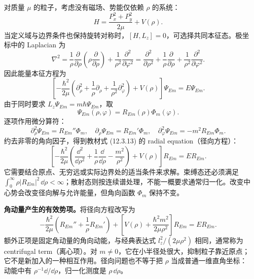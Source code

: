 对质量 $\mu$ 的粒子，考虑没有磁场、势能仅依赖 $\rho$ 的系统：
\begin{equation}
  H=\frac{P_x^2+P_y^2}{2\mu}+V(\rho).
\end{equation}
当定义域与边界条件也保持旋转对称时，$[H,L_z]=0$，可选择共同本征态。极坐标中的 Laplacian 为
\begin{equation}
  \nabla^2=\frac{1}{\rho}\frac{\partial}{\partial\rho}
          \left(\rho\frac{\partial}{\partial\rho}\right)
          +\frac{1}{\rho^2}\frac{\partial^2}{\partial\varphi^2}
  =\frac{\partial^2}{\partial\rho^2}
    +\frac{1}{\rho}\frac{\partial}{\partial\rho}
    +\frac{1}{\rho^2}\frac{\partial^2}{\partial\varphi^2}.
\end{equation}
因此能量本征方程为
\begin{equation}
  \left[-\frac{\hbar^2}{2\mu}
    \left(\partial_\rho^2+\frac{1}{\rho}\partial_\rho
          +\frac{1}{\rho^2}\partial_\varphi^2\right)
    +V(\rho)\right]\Psi_{Em}=E\Psi_{Em}.
\end{equation}
由于同时要求 $L_z\Psi_{Em}=m\hbar\Psi_{Em}$，取
\begin{equation}
  \Psi_{Em}(\rho,\varphi)=R_{Em}(\rho)\Phi_m(\varphi).
\end{equation}
逐项作用微分算符：
\begin{equation}
  \partial_\rho^2\Psi_{Em}=R_{Em}''\Phi_m,\quad
  \partial_\rho\Psi_{Em}=R_{Em}'\Phi_m,\quad
  \partial_\varphi^2\Psi_{Em}=-m^2R_{Em}\Phi_m.
\end{equation}
约去非零的角向因子，得到教材式 (12.3.13) 的 radial equation（径向方程）：
\begin{equation}
  \boxed{\left[-\frac{\hbar^2}{2\mu}
    \left(\frac{\dd^2}{\dd\rho^2}+\frac{1}{\rho}\frac{\dd}{\dd\rho}
          -\frac{m^2}{\rho^2}\right)+V(\rho)\right]R_{Em}
    =ER_{Em}.}
  \label{eq:QM-C12-S03-radial-equation}
\end{equation}
它需要结合原点、无穷远或实际边界处的适当条件来求解。束缚态还必须满足 $\int_0^\infty\rho|R_{Em}|^2\,\dd\rho<\infty$；散射态则按连续谱处理，不能一概要求通常归一化。改变中心势会改变径向解与允许能量，但角向函数 $\Phi_m$ 保持不变。

\textbf{角动量产生的有效势项。}将径向方程改写为
\begin{equation}
  -\frac{\hbar^2}{2\mu}\left(R_{Em}''+\frac{1}{\rho}R_{Em}'\right)
  +\left[V(\rho)+\frac{\hbar^2m^2}{2\mu\rho^2}\right]R_{Em}
  =ER_{Em}.
\end{equation}
额外正项是固定角动量的角向动能，与经典表达式 $l_z^2/(2\mu\rho^2)$ 相同，通常称为 centrifugal term（离心项）。对 $m\neq0$，它在小半径处很大，抑制粒子靠近原点；它不是新加入的一种相互作用。径向问题也不等于把 $\rho$ 当成普通一维直角坐标：动能中有 $\rho^{-1}\dd/\dd\rho$，归一化测度是 $\rho\,\dd\rho$。

